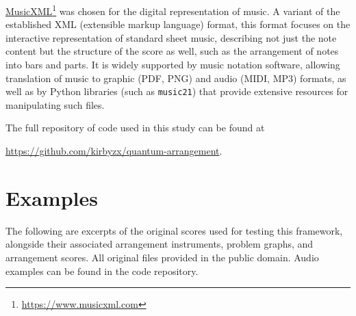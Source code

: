 \documentclass[twocolumn]{article}
\theoremstyle{definition}
\begin{document}
\href{https://www.musicxml.com}{MusicXML}\footnote{\url{https://www.musicxml.com}} was chosen for the digital representation of music. A variant of the established XML (extensible markup language) format, this format focuses on the interactive representation of standard sheet music, describing not just the note content but the structure of the score as well, such as the arrangement of notes into bars and parts. It is widely supported by music notation software, allowing translation of music to graphic (PDF, PNG) and audio (MIDI, MP3) formats, as well as by Python libraries (such as \texttt{music21}) that provide extensive resources for manipulating such files.

The full repository of code used in this study can be found at
\begin{center}
    \url{https://github.com/kirbyzx/quantum-arrangement}.
\end{center}

\section{Examples}
\label{app:examples}

The following are excerpts of the original scores used for testing this framework, alongside their associated arrangement instruments, problem graphs, and arrangement scores. All original files provided in the public domain. Audio examples can be found in the code repository.
\end{document}
